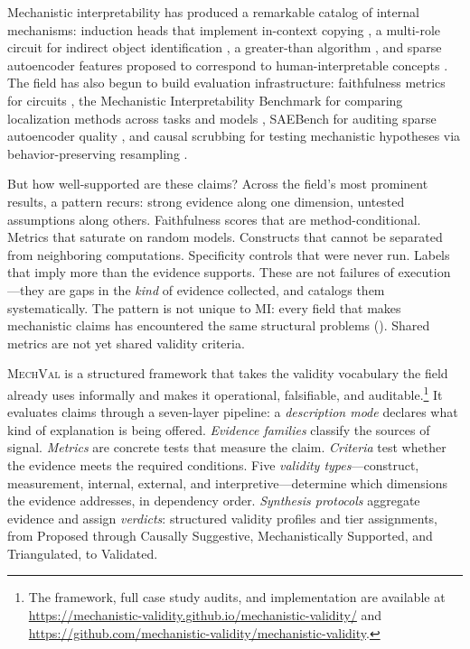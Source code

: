 \documentclass{article}
\newcommand{\mechval}{\textsc{MechVal}}
\begin{document}
Mechanistic interpretability has produced a remarkable catalog of internal mechanisms:
induction heads that implement in-context copying \citep{olsson2022context}, a multi-role
circuit for indirect object identification \citep{wang2023interpretability}, a greater-than
algorithm \citep{hanna2023greater}, and sparse autoencoder features proposed to correspond
to human-interpretable concepts \citep{cunningham2023sparse, bricken2024monosemanticity}. The field has also begun to
build evaluation infrastructure: faithfulness metrics for circuits
\citep{miller2024transformer}, the Mechanistic Interpretability Benchmark for comparing
localization methods across tasks and models \citep{mueller2025mib}, SAEBench for auditing
sparse autoencoder quality \citep{karvonen2025saebench}, and causal scrubbing for testing
mechanistic hypotheses via behavior-preserving resampling \citep{chan2022causal}.

But how well-supported are these claims? Across the field's most prominent results, a pattern recurs: strong evidence along one dimension, untested assumptions along others. Faithfulness scores that are method-conditional. Metrics that saturate on random models. Constructs that cannot be separated from neighboring computations. Specificity controls that were never run. Labels that imply more than the evidence supports. These are not failures of execution---they are gaps in the \emph{kind} of evidence collected, and  catalogs them systematically. The pattern is not unique to MI: every field that makes mechanistic claims has encountered the same structural problems (). Shared metrics are not yet shared validity criteria.

\mechval{} is a structured framework that takes the validity vocabulary the field already uses informally and makes it operational, falsifiable, and auditable.\footnote{The framework, full case study audits, and implementation are available at \url{https://mechanistic-validity.github.io/mechanistic-validity/} and \url{https://github.com/mechanistic-validity/mechanistic-validity}.} It evaluates claims through a seven-layer pipeline: a \emph{description mode} declares what kind of explanation is being offered. \emph{Evidence families} classify the sources of signal. \emph{Metrics} are concrete tests that measure the claim. \emph{Criteria} test whether the evidence meets the required conditions. Five \emph{validity types}---construct, measurement, internal, external, and interpretive---determine which dimensions the evidence addresses, in dependency order. \emph{Synthesis protocols} aggregate evidence and assign \emph{verdicts}: structured validity profiles and tier assignments, from Proposed through Causally Suggestive, Mechanistically Supported, and Triangulated, to Validated.
\end{document}
